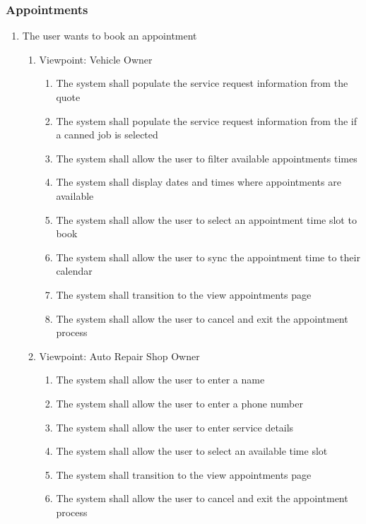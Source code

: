 \documentclass[12pt]{article}
\begin{document}
\subsubsection{Appointments}
\begin{enumerate}[resume*=business_events]
	\item The user wants to book an appointment
	      \begin{enumerate}[VP\arabic*.]
		      \item Viewpoint: Vehicle Owner
		            \begin{enumerate}
			            \item The system shall populate the service request information from the quote
			            \item The system shall populate the service request information from the if a canned job is selected
			            \item The system shall allow the user to filter available appointments times
			            \item The system shall display dates and times where appointments are available
			            \item The system shall allow the user to select an appointment time slot to book
			            \item The system shall allow the user to sync the appointment time to their calendar
			            \item The system shall transition to the view appointments page
			            \item The system shall allow the user to cancel and exit the appointment process
		            \end{enumerate}
		      \item Viewpoint: Auto Repair Shop Owner
		            \begin{enumerate}
			            \item The system shall allow the user to enter a name
			            \item The system shall allow the user to enter a phone number
			            \item The system shall allow the user to enter service details
			            \item The system shall allow the user to select an available time slot
			            \item The system shall transition to the view appointments page
			            \item The system shall allow the user to cancel and exit the appointment process

\end{enumerate}
\end{enumerate}
\end{enumerate}
\end{document}
